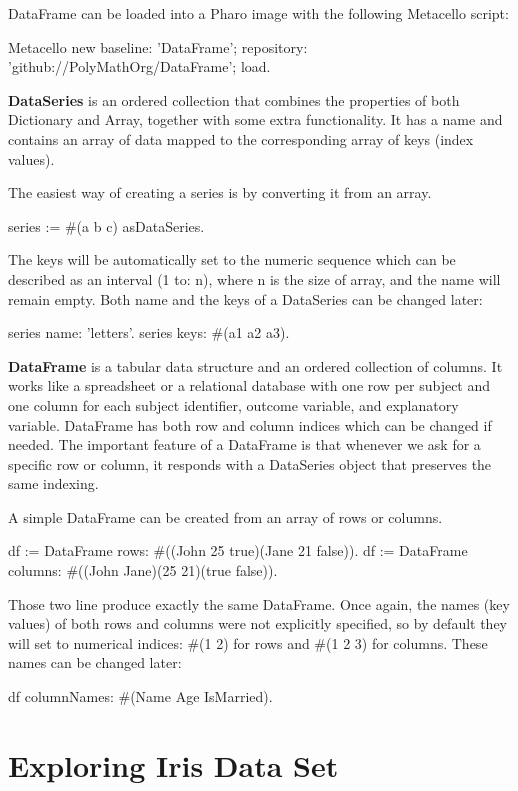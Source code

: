 \documentclass{article}
\begin{document}
\begin{multicols}{2}
DataFrame can be loaded into a Pharo image with the following Metacello script:
\begin{code}{}
Metacello new
    baseline: 'DataFrame';
    repository: 'github://PolyMathOrg/DataFrame';
    load.
\end{code}
\textbf{DataSeries} is an ordered collection that combines the properties of both Dictionary and Array, together with some extra functionality. It has a name and contains an array of data mapped to the corresponding array of keys (index values).

The easiest way of creating a series is by converting it from an array. 
\begin{code}{}
series := #(a b c) asDataSeries.
\end{code}
The keys will be automatically set to the numeric sequence which can be described as an interval (1 to: n), where n is the size of array, and the name will remain empty. Both name and the keys of a DataSeries can be changed later:
\begin{code}{}
series name: 'letters'.
series keys: #(a1 a2 a3).
\end{code}
\textbf{DataFrame} is a tabular data structure and an ordered collection of columns. It works like a spreadsheet or a relational database with one row per subject and one column for each subject identifier, outcome variable, and explanatory variable. DataFrame has both row and column indices which can be changed if needed. The important feature of a DataFrame is that whenever we ask for a specific row or column, it responds with a DataSeries object that preserves the same indexing.

A simple DataFrame can be created from an array of rows or columns.
\begin{code}{}
df := DataFrame rows: #((John 25 true)(Jane 21 false)).
df := DataFrame columns: #((John Jane)(25 21)(true false)).
\end{code}
Those two line produce exactly the same DataFrame. Once again, the names (key values) of both rows and columns were not explicitly specified, so by default they will set to numerical indices: \#(1 2) for rows and \#(1 2 3) for columns. These names can be changed later:
\begin{code}{}
df columnNames: #(Name Age IsMarried).
\end{code}
\section{Exploring Iris Data Set}
\label{sec:contribution}
%
%


\end{multicols}
\end{document}
